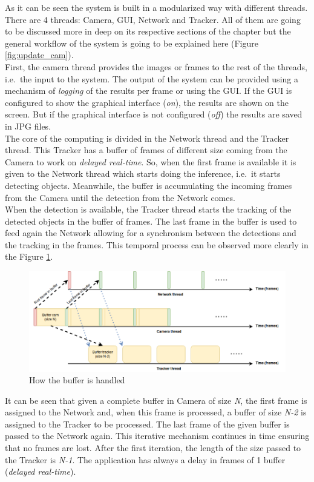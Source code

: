 As it can be seen the system is built in a modularized way with different threads. There are 4 threads: Camera, GUI, Network and Tracker. All of them are going to be discussed more in deep on its respective sections of the chapter but the general workflow of the system is going to be explained here (Figure \ref{fig:update_cam}).\\
First, the camera thread provides the images or frames to the rest of the threads, i.e.\ the input to the system. The output of the system can be provided using a mechanism of \textit{logging} of the results per frame or using the GUI. If the GUI is configured to show the graphical interface (\textit{on}), the results are shown on the screen. But if the graphical interface is not configured (\textit{off}) the results are saved in JPG files.\\ The core of the computing is divided in the Network thread and the Tracker thread. This Tracker has a buffer of frames of different size coming from the Camera to work on \textit{delayed real-time}. So, when the first frame is available it is given to the Network thread which starts doing the inference, i.e.\, it starts detecting objects. Meanwhile, the buffer is accumulating the incoming frames from the Camera until the detection from the Network comes.\\
When the detection is available, the Tracker thread starts the tracking of the detected objects in the buffer of frames. The last frame in the buffer is used to feed again the Network allowing for a synchronism between the detections and the tracking in the frames. This temporal process can be observed more clearly in the Figure \ref{fig:buffer}.
\begin{figure}[H]
\begin{center}
\includegraphics[scale=0.4]{figures/buffer.png}
\caption{How the buffer is handled}
\label{fig:buffer}
\end{center}
\end{figure}
It can be seen that given a complete buffer in Camera of size \textit{N}, the first frame is assigned to the Network and, when this frame is processed, a buffer of size \textit{N-2} is assigned to the Tracker to be processed. The last frame of the given buffer is passed to the Network again. This iterative mechanism continues in time ensuring that no frames are lost. After the first iteration, the length of the size passed to the Tracker is \textit{N-1}. The application has always a delay in frames of 1 buffer (\textit{delayed real-time}).
